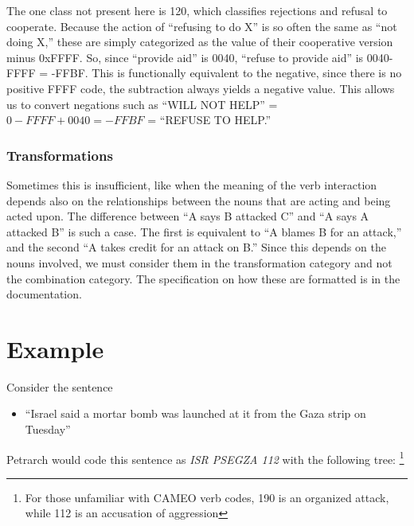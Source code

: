 \documentclass[11pt]{article}
\begin{document}
\vspace{12mm}
The one class not present here is 120, which classifies rejections and refusal 
to cooperate. Because the action of ``refusing to do X'' is so often the same as 
``not doing X,'' these are simply categorized as the value of their 
cooperative version minus 0xFFFF. So, since ``provide aid'' is 0040, ``refuse to provide 
aid'' is 0040-FFFF = -FFBF. This is functionally equivalent to the negative, 
since there is no positive FFFF code, the subtraction always yields a negative value. This allows us 
to convert negations such as ``WILL NOT HELP''  = $0 - FFFF + 0040 = -FFBF $ = ``REFUSE TO HELP.'' 
\subsubsection{Transformations}
Sometimes this is insufficient, like when the meaning of the verb interaction 
depends also on the relationships between the nouns that are acting and being 
acted upon. The difference between ``A says B attacked C'' and ``A says A 
attacked B'' is such a case. The first is equivalent to ``A blames B for an 
attack,'' and the second ``A takes credit for an attack on B.'' Since this 
depends on the nouns involved, we must consider them in the transformation
category and not the combination category. The specification on how these 
are formatted is in the documentation.

\section{Example}
Consider the sentence 
\begin{itemize} \item``Israel said a mortar bomb was launched at it from the 
Gaza strip on Tuesday''\end{itemize}
Petrarch would code this sentence as \textit{ISR PSEGZA 112} with the following tree:
\footnote{For those unfamiliar with CAMEO verb codes, 190 is an organized attack, while 112 is an accusation of aggression}\\
\end{document}

